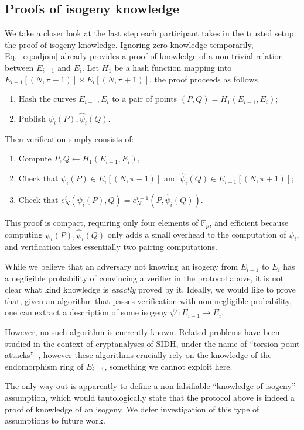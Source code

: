 \documentclass{llncs}
\newcommand{\F}{\mathbb{F}}
\begin{document}
\subsection{Proofs of isogeny knowledge}

We take a closer look at the last step each participant takes in the
trusted setup: the proof of isogeny knowledge. %
Ignoring zero-knowledge temporarily, Eq.~\eqref{eq:adjoin} already
provides a proof of knowledge of a non-trivial relation between
$E_{i-1}$ and $E_i$. %
Let $H_1$ be a hash function mapping into
$E_{i-1}[(N,\pi-1)] \times E_i[(N,\pi+1)]$, the proof proceeds as
follows
\begin{enumerate}
\item Hash the curves $E_{i-1},E_i$ to a pair of points
  $(P,Q) = H_1(E_{i-1},E_i)$;
\item Publish $\psi_i(P), \hat\psi_i(Q)$.
\end{enumerate}
Then verification simply consists of:
\begin{enumerate}
\item Compute $P,Q\gets H_1(E_{i-1},E_i)$,
\item Check that $\psi_i(P)\in E_i[(N,\pi-1)]$ and
  $\hat\psi_i(Q)\in E_{i-1}[(N,\pi+1)]$;
\item Check that $e_N^i(\psi_i(P),Q) = e_N^{i-1}(P,\hat\psi_i(Q))$.
\end{enumerate}

This proof is compact, requiring only four elements of $\F_p$, and
efficient because computing $\psi_i(P),\hat\psi_i(Q)$ only adds a
small overhead to the computation of $\psi_i$, and verification takes
essentially two pairing computations. %

\begin{remark}
  While we believe that an adversary not knowing an isogeny from
  $E_{i-1}$ to $E_i$ has a negligible probability of convincing a
  verifier in the protocol above, it is not clear what kind knowledge
  is \emph{exactly} proved by it. %
  Ideally, we would like to prove that, given an algorithm that passes
  verification with non negligible probability, one can extract a
  description of some isogeny $\psi':E_{i-1}\to E_{i}$. %

  However, no such algorithm is currently known. %
  Related problems have been studied in the context of cryptanalyses
  of SIDH, under the name of ``torsion point
  attacks''~\cite{10.1007/978-3-319-70697-9_12,cryptoeprint:2019:1291,cryptoeprint:2020:633},
  however these algorithms crucially rely on the knowledge of the
  endomorphism ring of $E_{i-1}$, something we cannot exploit here.

  The only way out is apparently to define a non-falsifiable
  ``knowledge of isogeny'' assumption, which would tautologically
  state that the protocol above is indeed a proof of knowledge of an
  isogeny. %
  We defer investigation of this type of assumptions to future work.
\end{remark}
\end{document}
